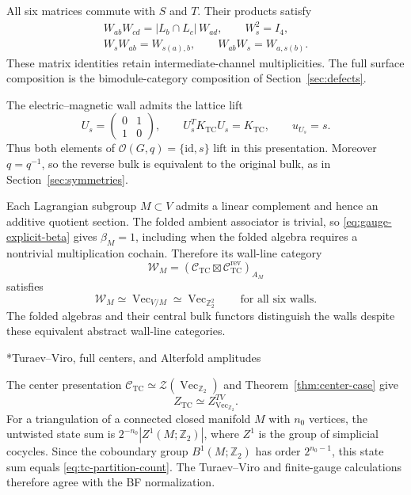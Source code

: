 \documentclass[12pt]{amsart}
\makeatletter
\renewcommand\subsection{\@startsection{subsection}{2}%
  \z@{.5\linespacing\@plus.7\linespacing}{-.5em}%
  {\normalfont\bfseries}}
\numberwithin{equation}{section}
\theoremstyle{definition}
\makeatother
\begin{document}
All six matrices commute with $S$ and $T$. Their products satisfy
\begin{equation}
\label{eq:tc-transmission-composition}
\begin{gathered}
W_{ab}W_{cd}
=
|L_b\cap L_c|\,W_{ad},
\qquad
W_s^2=I_4,
\\
W_sW_{ab}=W_{s(a),b},
\qquad
W_{ab}W_s=W_{a,s(b)}.
\end{gathered}
\end{equation}
These matrix identities retain intermediate-channel
multiplicities. The full surface composition is the
bimodule-category composition of Section~\ref{sec:defects}.

The electric--magnetic wall admits the lattice lift
$$
U_s=
\begin{pmatrix}
0&1\\
1&0
\end{pmatrix},
\qquad
U_s^T K_{\mathrm{TC}}U_s=K_{\mathrm{TC}},
\qquad
u_{U_s}=s.
$$
Thus both elements of
$\mathcal O(G,q)=\{\mathrm{id},s\}$ lift in this presentation.
Moreover $q=q^{-1}$, so the reverse bulk is equivalent to the
original bulk, as in Section~\ref{sec:symmetries}.

Each Lagrangian subgroup $M\subset V$ admits a linear complement
and hence an additive quotient section. The folded ambient
associator is trivial, so \eqref{eq:gauge-explicit-beta} gives
$\beta_M=1$, including when the folded algebra requires a
nontrivial multiplication cochain. Therefore its wall-line category
$$
\mathcal W_M
=
(\mathcal C_{\mathrm{TC}}\boxtimes
 \mathcal C_{\mathrm{TC}}^{\mathrm{rev}})_{A_M}
$$
satisfies
\begin{equation}
\label{eq:gauge-toric-wall-lines}
\mathcal W_M
\simeq\operatorname{Vec}_{V/M}
\simeq\operatorname{Vec}_{\mathbb Z_2^2}
\qquad\text{for all six walls}.
\end{equation}
The folded algebras and their central bulk functors distinguish
the walls despite these equivalent abstract wall-line categories.

\subsection*{Turaev--Viro, full centers, and Alterfold amplitudes}

The center presentation
$\mathcal C_{\mathrm{TC}}
\simeq\mathcal Z(\operatorname{Vec}_{\mathbb Z_2})$
and Theorem~\ref{thm:center-case} give
\begin{equation}
\label{eq:tc-tv-single}
Z_{\mathrm{TC}}
\simeq Z^{TV}_{\operatorname{Vec}_{\mathbb Z_2}}.
\end{equation}
For a triangulation of a connected closed manifold $M$ with
$n_0$ vertices, the untwisted state sum is
$2^{-n_0}|Z^1(M;\mathbb Z_2)|$, where $Z^1$ is the group of
simplicial cocycles. Since the coboundary group
$B^1(M;\mathbb Z_2)$ has order $2^{n_0-1}$, this state sum equals
\eqref{eq:tc-partition-count}. The Turaev--Viro and finite-gauge
calculations therefore agree with the BF normalization.
\end{document}
